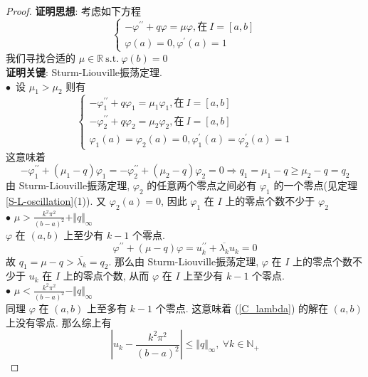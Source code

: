 \documentclass[11pt]{ctexart}[UTF8]
\begin{document}
\begin{proof}
    \textbf{证明思想}: 考虑如下方程
\begin{equation}\label{C_lambda}
    \begin{cases}
        -\varphi^{\prime\prime} + q \varphi = \mu \varphi, \text{在}\  I=[a,b] \\
        \varphi(a) = 0, \varphi^{\prime}(a) = 1
    \end{cases}
\end{equation}
我们寻找合适的 $\mu \in \mathbb{R}\ \mathrm{s.t.}\ \varphi(b) = 0$ \\
\textbf{证明关键}: Sturm-Liouville振荡定理. \\
$\bullet$\ 设 $\mu_1 > \mu_{2}$ 则有
\begin{equation*}
    \begin{cases}
        -\varphi_{1}^{\prime\prime} + q \varphi_{1} = \mu_1 \varphi_{1}, \text{在}\  I=[a,b] \\
        -\varphi_{2}^{\prime\prime} + q \varphi_{2} = \mu_2 \varphi_{2}, \text{在}\  I=[a,b] \\
        \varphi_{1}(a) = \varphi_{2}(a) = 0, \varphi_{1}^{\prime}(a) = \varphi_{2}^{\prime}(a) = 1
    \end{cases}
\end{equation*}
这意味着
\begin{equation*}
    -\varphi_{1}^{\prime\prime} + (\mu_{1}-q)\varphi_{1}= -\varphi_{2}^{\prime\prime} + (\mu_{2}-q)\varphi_{2}=0 \Longrightarrow q_{1} = \mu_{1}-q \geq \mu_{2}-q = q_{2}
\end{equation*}
由 Sturm-Liouville振荡定理, $\varphi_{2}$ 的任意两个零点之间必有 $\varphi_{1}$ 的一个零点(见定理\ref{S-L-oscillation}(1)). 又 $\varphi_{2}(a) = 0$, 因此 $\varphi_{1}$ 在 $I$ 上的零点个数不少于 $\varphi_{2}$\\
$\bullet$ $\mu > \frac{k^2\pi^2}{(b-a)^2}+\Vert q \Vert_{\infty}$\\
$\varphi$ 在 $(a,b)$ 上至少有 $k-1$ 个零点.
\begin{equation*}
    \varphi^{\prime\prime} + \left( \mu - q \right) \varphi = u^{\prime\prime}_{k}+\overline{\lambda_{k}} u_{k}=0
\end{equation*}
故 $q_{1} = \mu - q > \overline{\lambda_{k}}=q_{2}$. 那么由 Sturm-Liouville振荡定理, $\varphi$ 在 $I$ 上的零点个数不少于 $u_{k}$ 在 $I$ 上的零点个数, 从而 $\varphi$ 在 $I$ 上至少有 $k-1$ 个零点.\\
$\bullet$ $\mu < \frac{k^2\pi^2}{(b-a)^2}-\Vert q \Vert_{\infty}$\\
同理 $\varphi$ 在 $(a,b)$ 上至多有 $k-1$ 个零点. 这意味着 (\ref{C_lambda}) 的解在 $(a,b)$ 上没有零点.
那么综上有
\begin{equation*}
    \left| u_{k}-\frac{k^2\pi^{2}}{(b-a)^2} \right|\leq \Vert q \Vert_{\infty},\ \forall k \in \mathbb{N}_{+}
\end{equation*}


\end{proof}
\end{document}
